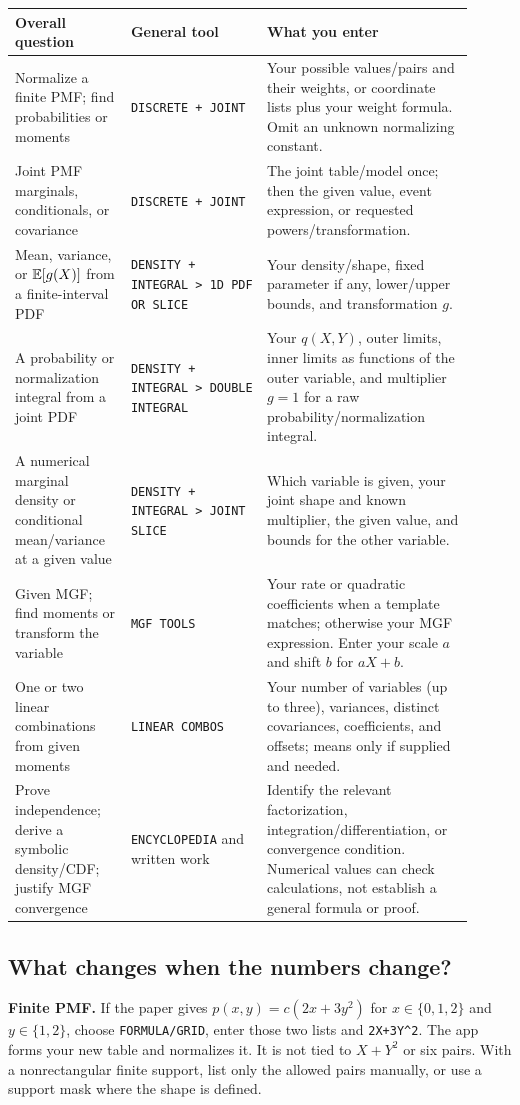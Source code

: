 \begin{longtable}{@{}>{\raggedright\arraybackslash}p{0.23\linewidth}>{\raggedright\arraybackslash}p{0.27\linewidth}>{\raggedright\arraybackslash}p{0.41\linewidth}@{}}
\toprule Overall question & General tool & What you enter\\\midrule\endhead
Normalize a finite PMF; find probabilities or moments & \texttt{DISCRETE + JOINT} & Your possible values/pairs and their weights, or coordinate lists plus your weight formula. Omit an unknown normalizing constant.\\
Joint PMF marginals, conditionals, or covariance & \texttt{DISCRETE + JOINT} & The joint table/model once; then the given value, event expression, or requested powers/transformation.\\
Mean, variance, or $\mathbb E[g(X)]$ from a finite-interval PDF & \texttt{DENSITY + INTEGRAL > 1D PDF OR SLICE} & Your density/shape, fixed parameter if any, lower/upper bounds, and transformation $g$.\\
A probability or normalization integral from a joint PDF & \texttt{DENSITY + INTEGRAL > DOUBLE INTEGRAL} & Your $q(X,Y)$, outer limits, inner limits as functions of the outer variable, and multiplier $g=1$ for a raw probability/normalization integral.\\
A numerical marginal density or conditional mean/variance at a given value & \texttt{DENSITY + INTEGRAL > JOINT SLICE} & Which variable is given, your joint shape and known multiplier, the given value, and bounds for the other variable.\\
Given MGF; find moments or transform the variable & \texttt{MGF TOOLS} & Your rate or quadratic coefficients when a template matches; otherwise your MGF expression. Enter your scale $a$ and shift $b$ for $aX+b$.\\
One or two linear combinations from given moments & \texttt{LINEAR COMBOS} & Your number of variables (up to three), variances, distinct covariances, coefficients, and offsets; means only if supplied and needed.\\
Prove independence; derive a symbolic density/CDF; justify MGF convergence & \texttt{ENCYCLOPEDIA} and written work & Identify the relevant factorization, integration/differentiation, or convergence condition. Numerical values can check calculations, not establish a general formula or proof.\\\bottomrule
\end{longtable}

\subsection{What changes when the numbers change?}
\textbf{Finite PMF.} If the paper gives $p(x,y)=c(2x+3y^2)$ for $x\in\{0,1,2\}$ and $y\in\{1,2\}$, choose \texttt{FORMULA/GRID}, enter those two lists and \texttt{2X+3Y\^{}2}. The app forms your new table and normalizes it. It is not tied to $X+Y^2$ or six pairs. With a nonrectangular finite support, list only the allowed pairs manually, or use a support mask where the shape is defined.


